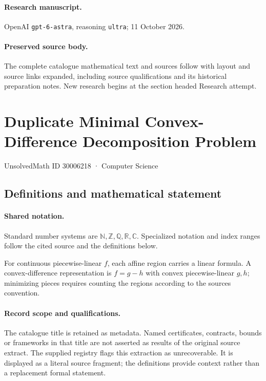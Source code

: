 \documentclass[11pt]{article}
\begin{document}
\paragraph{Research manuscript.} OpenAI \texttt{gpt-6-astra}, reasoning \texttt{ultra}; 11 October 2026.
\paragraph{Preserved source body.} The complete catalogue mathematical text and sources follow with layout and source links expanded, including source qualifications and its historical preparation notes. New research begins at the section headed Research attempt.

\section{Duplicate Minimal Convex-Difference Decomposition Problem}\label{30006218}
{\small UnsolvedMath ID 30006218 · Computer Science}
\subsection{Definitions and mathematical statement}

\paragraph{Shared notation.}Standard number systems are $\mathbb N,\mathbb Z,\mathbb Q,\mathbb R,\mathbb C$. Specialized notation and index ranges follow the cited source and the definitions below.


For continuous piecewise-linear $f$, each affine region carries a linear formula. A convex-difference representation is $f=g-h$ with convex piecewise-linear $g,h$; minimizing pieces requires counting the regions according to the source\textquotesingle s convention.
\paragraph{Record scope and qualifications.}
The catalogue title is retained as metadata. Named certificates, contracts, bounds or frameworks in that title are not asserted as results of the original source extract.
The supplied registry flags this extraction as unrecoverable. It is displayed as a literal source fragment; the definitions provide context rather than a replacement formal statement.
\end{document}
